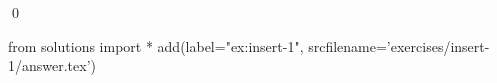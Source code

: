 
\begin{ex} 
  \label{ex:insert-1}
  
  \qed
\end{ex} 
\begin{python0}
from solutions import *
add(label="ex:insert-1",
    srcfilename='exercises/insert-1/answer.tex') 
\end{python0}
